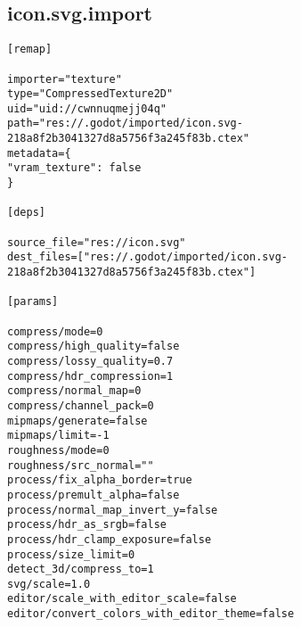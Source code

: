 \subsection{icon.svg.import}

\begin{lstlisting}
[remap]

importer="texture"
type="CompressedTexture2D"
uid="uid://cwnnuqmejj04q"
path="res://.godot/imported/icon.svg-218a8f2b3041327d8a5756f3a245f83b.ctex"
metadata={
"vram_texture": false
}

[deps]

source_file="res://icon.svg"
dest_files=["res://.godot/imported/icon.svg-218a8f2b3041327d8a5756f3a245f83b.ctex"]

[params]

compress/mode=0
compress/high_quality=false
compress/lossy_quality=0.7
compress/hdr_compression=1
compress/normal_map=0
compress/channel_pack=0
mipmaps/generate=false
mipmaps/limit=-1
roughness/mode=0
roughness/src_normal=""
process/fix_alpha_border=true
process/premult_alpha=false
process/normal_map_invert_y=false
process/hdr_as_srgb=false
process/hdr_clamp_exposure=false
process/size_limit=0
detect_3d/compress_to=1
svg/scale=1.0
editor/scale_with_editor_scale=false
editor/convert_colors_with_editor_theme=false
\end{lstlisting}